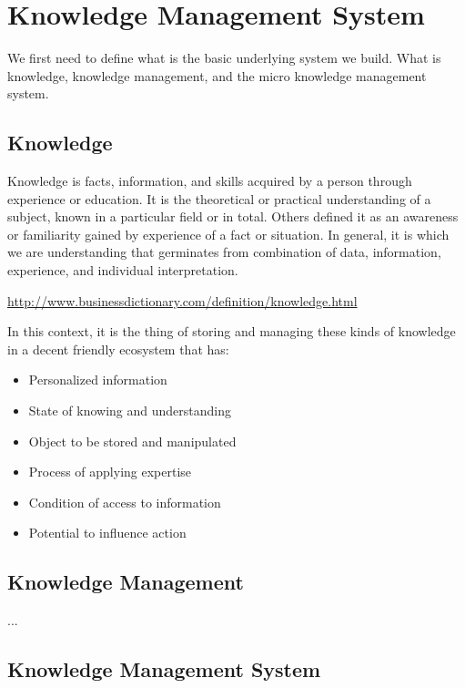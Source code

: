 \section{Knowledge Management System}
\label{sec:kms}

We first need to define what is the basic underlying system we build.
What is knowledge, knowledge management, and the micro knowledge management system.

\subsection{Knowledge}

Knowledge is facts, information, and skills acquired by a person through experience or education.
It is the theoretical or practical understanding of a subject, known in a particular field or in total.
Others defined it as an awareness or familiarity gained by experience of a fact or situation.
In general, it is which we are understanding that germinates from combination of data, information, experience, and individual interpretation.

\url{http://www.businessdictionary.com/definition/knowledge.html}

In this context, it is the thing of storing and managing these kinds of knowledge in a decent friendly ecosystem that has:

\begin{itemize}
  \item Personalized information
  \item State of knowing and understanding
  \item Object to be stored and manipulated
  \item Process of applying expertise
  \item Condition of access to information
  \item Potential to influence action
\end{itemize}

\subsection{Knowledge Management}

...

\subsection{Knowledge Management System}

